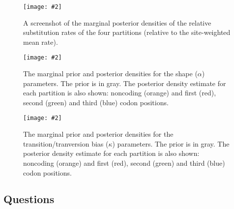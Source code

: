 \documentclass[12pt]{article}
\newcommand{\includeimage}[2][]{%
\texttt{[image: \#2]}
}
\begin{document}


\begin{figure}
\centering	
\includeimage[width=\textwidth]{figures/Tracer_marginalDensity}
\caption{A screenshot of the marginal posterior densities of the relative substitution rates of the four partitions (relative to the site-weighted mean rate).}
\label{fig:Tracer_marginalDensity}
\end{figure}


\begin{figure}
\centering	
\includeimage[width=\textwidth]{figures/primatePriorPosteriorKappa}

%
\caption{The marginal prior and posterior densities for the shape ($\alpha$) parameters. The prior is in gray. The posterior density estimate for each partition is also shown: noncoding (orange) and first (red), second (green) and third (blue) codon positions.}
\label{fig:primatePriorPosteriorShape}

\includeimage[width=\textwidth]{figures/primatePriorPosteriorShape}

%
\caption{The marginal prior and posterior densities for the transition/tranversion bias ($\kappa$) parameters. The prior is in gray. The posterior density estimate for each partition is also shown: noncoding (orange) and first (red), second (green) and third (blue) codon positions.}
\label{fig:primatePriorPosteriorKappa}
\end{figure}

\newpage
\subsection*{Questions}
\vspace{5 mm}
\end{document}
